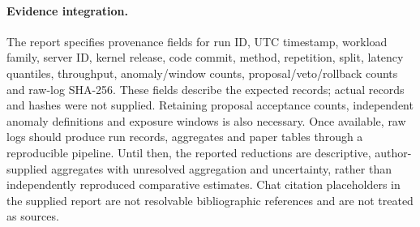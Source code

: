 \paragraph{Evidence integration.}
The report specifies provenance fields for run ID, UTC timestamp, workload family, server ID, kernel release, code commit, method, repetition, split, latency quantiles, throughput, anomaly/window counts, proposal/veto/rollback counts and raw-log SHA-256. These fields describe the expected records; actual records and hashes were not supplied. Retaining proposal acceptance counts, independent anomaly definitions and exposure windows is also necessary. Once available, raw logs should produce run records, aggregates and paper tables through a reproducible pipeline. Until then, the reported reductions are descriptive, author-supplied aggregates with unresolved aggregation and uncertainty, rather than independently reproduced comparative estimates. Chat citation placeholders in the supplied report are not resolvable bibliographic references and are not treated as sources.
